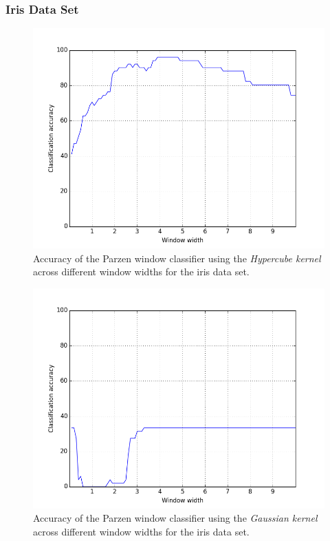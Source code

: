 \documentclass{article}
\numberwithin{figure}{section}
\begin{document}
\subsubsection{Iris Data Set}
\begin{figure}[H]
\centering
\includegraphics[width=.8\textwidth]{p_box_iris}
\caption{Accuracy of the Parzen window classifier using the \emph{Hypercube kernel} across different window widths for the iris data set.}
\label{pb_iris}
\end{figure}

\begin{figure}[H]
\centering
\includegraphics[width=.8\textwidth]{pg_iris}
\caption{Accuracy of the Parzen window classifier using the \emph{Gaussian kernel} across different window widths for the iris data set.}
\label{pg_iris}
\end{figure}
\end{document}
